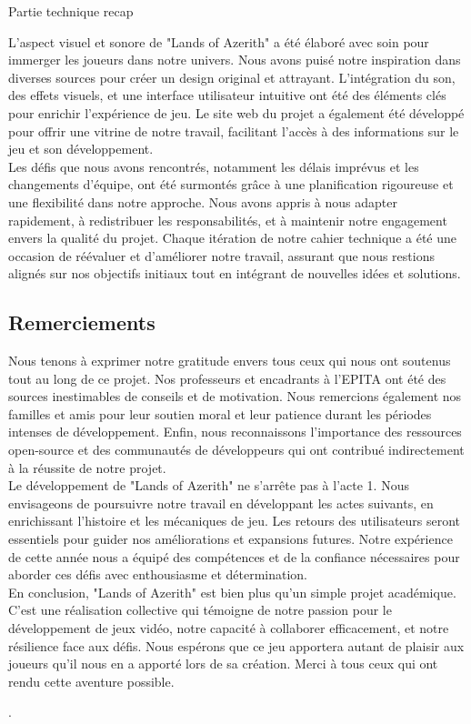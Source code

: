  

Partie technique recap 


 

  

L'aspect visuel et sonore de "Lands of Azerith" a été élaboré avec soin pour immerger les joueurs dans notre univers.
 Nous avons puisé notre inspiration dans diverses sources pour créer un design original et attrayant. 
 L'intégration du son, des effets visuels, et une interface utilisateur intuitive ont été des éléments clés pour enrichir l'expérience de jeu. 
 Le site web du projet a également été développé pour offrir une vitrine de notre travail, facilitant l'accès à des informations sur le jeu et son développement. 
\\

Les défis que nous avons rencontrés, notamment les délais imprévus et les changements d'équipe, ont été surmontés grâce à une planification rigoureuse 
et une flexibilité dans notre approche. Nous avons appris à nous adapter rapidement, à redistribuer les responsabilités, et à maintenir notre engagement
 envers la qualité du projet. Chaque itération de notre cahier technique a été une occasion de réévaluer et d'améliorer notre travail, assurant que nous 
 restions alignés sur nos objectifs initiaux tout en intégrant de nouvelles idées et solutions. 
\\

  

 
\subsection{Remerciements}

Nous tenons à exprimer notre gratitude envers tous ceux qui nous ont soutenus tout au long de ce projet. Nos professeurs et encadrants à l'EPITA ont été des sources inestimables de conseils et de motivation. Nous remercions également nos familles et amis pour leur soutien moral et leur patience durant les périodes intenses de développement. Enfin, nous reconnaissons l'importance des ressources open-source et des communautés de développeurs qui ont contribué indirectement à la réussite de notre projet.
\\

Le développement de "Lands of Azerith" ne s'arrête pas à l'acte 1. Nous envisageons de poursuivre notre travail en développant les actes suivants, en enrichissant l'histoire et les mécaniques de jeu. Les retours des utilisateurs seront essentiels pour guider nos améliorations et expansions futures. Notre expérience de cette année nous a équipé des compétences et de la confiance nécessaires pour aborder ces défis avec enthousiasme et détermination.
\\

En conclusion, "Lands of Azerith" est bien plus qu'un simple projet académique. C'est une réalisation collective qui témoigne de notre passion pour le développement de jeux vidéo, notre capacité à collaborer efficacement, et notre résilience face aux défis. Nous espérons que ce jeu apportera autant de plaisir aux joueurs qu'il nous en a apporté lors de sa création. Merci à tous ceux qui ont rendu cette aventure possible.

  

. 